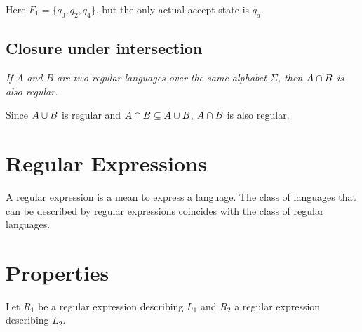 \documentclass{article}
\newcommand{\emptyString}{\lambda}
\begin{document}
\begin{center}
\end{center}
Here \(F_1=\{q_0, q_2, q_4\}\), but the only actual accept state is \(q_a\).

\subsection{Closure under intersection}

\textit{If \(A\) and \(B\) are two regular languages over the same alphabet
\(\Sigma\), then \(A \cap B\) is also regular.}

Since \(A\cup B\) is regular and \(A \cap B \subseteq A \cup B\),
\(A \cap B\) is also regular.

\section{Regular Expressions}

A regular expression is a mean to express a language.
The class of languages that can be described by
regular expressions coincides with the class of regular languages.

\section{Properties}

Let \(R_1\) be a regular expression describing \(L_1\) and \(R_2\) a regular expression
describing \(L_2\).
\end{document}
